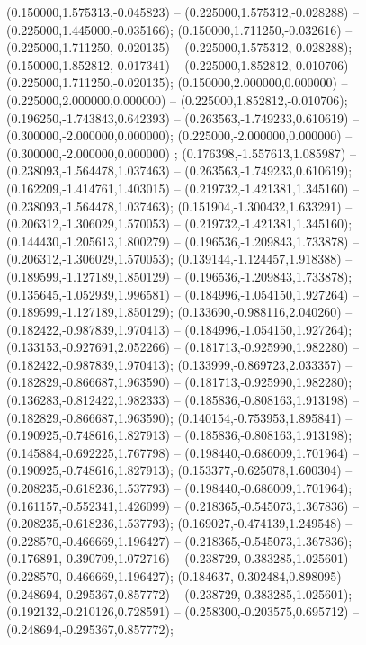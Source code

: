  (0.150000,1.575313,-0.045823) -- (0.225000,1.575312,-0.028288) -- (0.225000,1.445000,-0.035166);
 (0.150000,1.711250,-0.032616) -- (0.225000,1.711250,-0.020135) -- (0.225000,1.575312,-0.028288);
 (0.150000,1.852812,-0.017341) -- (0.225000,1.852812,-0.010706) -- (0.225000,1.711250,-0.020135);
 (0.150000,2.000000,0.000000) -- (0.225000,2.000000,0.000000) -- (0.225000,1.852812,-0.010706);
 (0.196250,-1.743843,0.642393) -- (0.263563,-1.749233,0.610619) -- (0.300000,-2.000000,0.000000);
 (0.225000,-2.000000,0.000000) -- (0.300000,-2.000000,0.000000) ;
 (0.176398,-1.557613,1.085987) -- (0.238093,-1.564478,1.037463) -- (0.263563,-1.749233,0.610619);
 (0.162209,-1.414761,1.403015) -- (0.219732,-1.421381,1.345160) -- (0.238093,-1.564478,1.037463);
 (0.151904,-1.300432,1.633291) -- (0.206312,-1.306029,1.570053) -- (0.219732,-1.421381,1.345160);
 (0.144430,-1.205613,1.800279) -- (0.196536,-1.209843,1.733878) -- (0.206312,-1.306029,1.570053);
 (0.139144,-1.124457,1.918388) -- (0.189599,-1.127189,1.850129) -- (0.196536,-1.209843,1.733878);
 (0.135645,-1.052939,1.996581) -- (0.184996,-1.054150,1.927264) -- (0.189599,-1.127189,1.850129);
 (0.133690,-0.988116,2.040260) -- (0.182422,-0.987839,1.970413) -- (0.184996,-1.054150,1.927264);
 (0.133153,-0.927691,2.052266) -- (0.181713,-0.925990,1.982280) -- (0.182422,-0.987839,1.970413);
 (0.133999,-0.869723,2.033357) -- (0.182829,-0.866687,1.963590) -- (0.181713,-0.925990,1.982280);
 (0.136283,-0.812422,1.982333) -- (0.185836,-0.808163,1.913198) -- (0.182829,-0.866687,1.963590);
 (0.140154,-0.753953,1.895841) -- (0.190925,-0.748616,1.827913) -- (0.185836,-0.808163,1.913198);
 (0.145884,-0.692225,1.767798) -- (0.198440,-0.686009,1.701964) -- (0.190925,-0.748616,1.827913);
 (0.153377,-0.625078,1.600304) -- (0.208235,-0.618236,1.537793) -- (0.198440,-0.686009,1.701964);
 (0.161157,-0.552341,1.426099) -- (0.218365,-0.545073,1.367836) -- (0.208235,-0.618236,1.537793);
 (0.169027,-0.474139,1.249548) -- (0.228570,-0.466669,1.196427) -- (0.218365,-0.545073,1.367836);
 (0.176891,-0.390709,1.072716) -- (0.238729,-0.383285,1.025601) -- (0.228570,-0.466669,1.196427);
 (0.184637,-0.302484,0.898095) -- (0.248694,-0.295367,0.857772) -- (0.238729,-0.383285,1.025601);
 (0.192132,-0.210126,0.728591) -- (0.258300,-0.203575,0.695712) -- (0.248694,-0.295367,0.857772);
